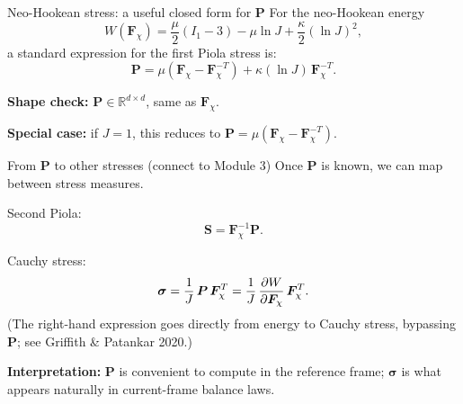 \documentclass[aspectratio=169]{beamer}
\newcommand{\R}{\mathbb{R}}
\newcommand{\sigmaC}{\bm{\sigma}} %
\newcommand{\Sten}{\bm{S}}     %
\newcommand{\Fdef}{\bm{F}_{\chi}}  %
\newcommand{\Pten}{\bm{P}}         %
\begin{document}
\begin{frame}{Neo-Hookean stress: a useful closed form for \(\Pten\)}
\small
For the neo-Hookean energy
\[
W(\Fdef)=\frac{\mu}{2}(I_1-3)-\mu\ln J+\frac{\kappa}{2}(\ln J)^2,
\]
a standard expression for the first Piola stress is:
\[
\Pten = \mu\left(\Fdef-\Fdef^{-T}\right)+\kappa(\ln J)\,\Fdef^{-T}.
\]

\medskip
\textbf{Shape check:} \(\Pten\in\R^{d\times d}\), same as \(\Fdef\).

\medskip
\textbf{Special case:} if \(J=1\), this reduces to \(\Pten=\mu(\Fdef-\Fdef^{-T})\).

\end{frame}

\begin{frame}{From \(\Pten\) to other stresses (connect to Module 3)}
\small
Once \(\Pten\) is known, we can map between stress measures.

\medskip
Second Piola:
\[
\Sten = \Fdef^{-1}\Pten.
\]

\medskip
Cauchy stress:
\[
\sigmaC = \frac{1}{J}\,\Pten\,\Fdef^T
       = \frac{1}{J}\,\pdv{W}{\Fdef}\,\Fdef^T.
\]
\scriptsize (The right-hand expression goes directly from energy to Cauchy stress, bypassing \(\Pten\); see Griffith \& Patankar 2020.)

\medskip
\small
\textbf{Interpretation:} \(\Pten\) is convenient to compute in the reference frame; \(\sigmaC\) is what appears naturally in current-frame balance laws.

\end{frame}



\end{document}

